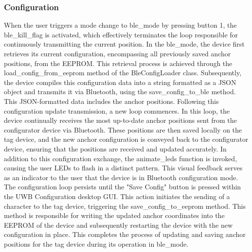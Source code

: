 \subsubsection{Configuration}
When the user triggers a mode change to ble\_mode by pressing button 1, the ble\_kill\_flag is activated, which effectively terminates the loop responsible for continuously transmitting the current position.
\vspace{4pt}
\newline
In the ble\_mode, the device first retrieves its current configuration, encompassing all previously saved anchor positions, from the EEPROM. This retrieval process is achieved through the load\_config\_from\_eeprom method of the BleConfigLoader class. 
Subsequently, the device compiles this configuration data into a string formatted as a JSON object and transmits it via Bluetooth, using the save\_config\_to\_ble method. 
This JSON-formatted data includes the anchor positions.
\vspace{4pt}
\newline
Following this configuration update transmission, a new loop commences. In this loop, the device continually receives the most up-to-date anchor positions sent from the configurator device via Bluetooth. 
These positions are then saved locally on the tag device, and the new anchor configuration is conveyed back to the configurator device, ensuring that the positions are received and updated accurately.
\vspace{4pt}
\newline
In addition to this configuration exchange, the animate\_leds function is invoked, causing the user LEDs to flash in a distinct pattern. 
This visual feedback serves as an indicator to the user that the device is in Bluetooth configuration mode.
\vspace{4pt}
\newline
The configuration loop persists until the "Save Config" button is pressed within the UWB Configuration desktop GUI. 
This action initiates the sending of a character to the tag device, triggering the save\_config\_to\_eeprom method. 
This method is responsible for writing the updated anchor coordinates into the EEPROM of the device and subsequently restarting the device with the new configuration in place. 
This completes the process of updating and saving anchor positions for the tag device during its operation in ble\_mode.



